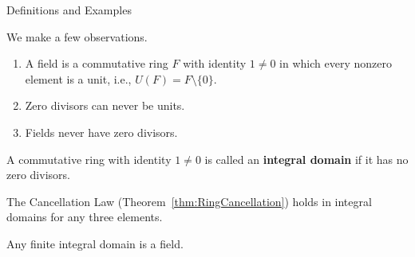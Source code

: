 \begin{section}{Definitions and Examples}
\begin{remark}
We make a few observations.
\begin{enumerate}[label=\rm{(\alph*)}]
\item A field is a commutative ring $F$ with identity $1\neq 0$ in which every nonzero element is a unit, i.e., $U(F)=F\setminus\{0\}$.
\item Zero divisors can never be units.
\item Fields never have zero divisors.
\end{enumerate}
\end{remark}

\begin{definition}
A commutative ring with identity $1\neq 0$ is called an \textbf{integral domain} if it has no zero divisors.
\end{definition}

\begin{remark}
The Cancellation Law (Theorem~\ref{thm:RingCancellation}) holds in integral domains for any three elements.
\end{remark}

\begin{theorem}
Any finite integral domain is a field.
\end{theorem}



\end{section}
